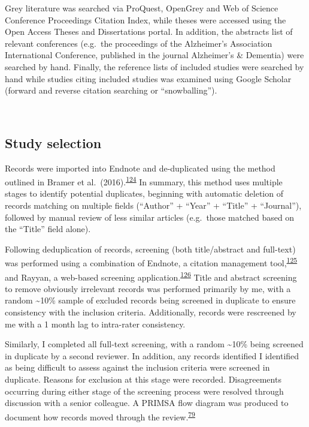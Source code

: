\documentclass[a4paper, twoside]{templates/ociamthesis}
\begin{document}
Grey literature was searched via ProQuest, OpenGrey and Web of Science Conference Proceedings Citation Index, while theses were accessed using the Open Access Theses and Dissertations portal. In addition, the abstracts list of relevant conferences (e.g.~the proceedings of the Alzheimer's Association International Conference, published in the journal Alzheimer's \& Dementia) were searched by hand. Finally, the reference lists of included studies were searched by hand while studies citing included studies was examined using Google Scholar (forward and reverse citation searching or ``snowballing'').

~

\hypertarget{study-selection}{%
\subsection{Study selection}\label{study-selection}}

Records were imported into Endnote and de-duplicated using the method outlined in Bramer et al.~(2016).\textsuperscript{\protect\hyperlink{ref-bramer2016}{124}} In summary, this method uses multiple stages to identify potential duplicates, beginning with automatic deletion of records matching on multiple fields (``Author'' + ``Year'' + ``Title'' + ``Journal''), followed by manual review of less similar articles (e.g.~those matched based on the ``Title'' field alone).

Following deduplication of records, screening (both title/abstract and full-text) was performed using a combination of Endnote, a citation management tool,\textsuperscript{\protect\hyperlink{ref-hupe2019}{125}} and Rayyan, a web-based screening application.\textsuperscript{\protect\hyperlink{ref-ouzzani2016}{126}} Title and abstract screening to remove obviously irrelevant records was performed primarily by me, with a random \textasciitilde10\% sample of excluded records being screened in duplicate to ensure consistency with the inclusion criteria. Additionally, records were rescreened by me with a 1 month lag to intra-rater consistency.

Similarly, I completed all full-text screening, with a random \textasciitilde10\% being screened in duplicate by a second reviewer. In addition, any records identified I identified as being difficult to assess against the inclusion criteria were screened in duplicate. Reasons for exclusion at this stage were recorded. Disagreements occurring during either stage of the screening process were resolved through discussion with a senior colleague. A PRIMSA flow diagram was produced to document how records moved through the review.\textsuperscript{\protect\hyperlink{ref-page2021}{79}}
\end{document}
